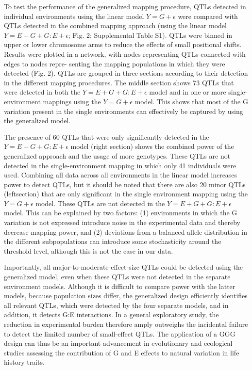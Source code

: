 To test the performance of the generalized mapping procedure, QTLs detected in individual environments
using the linear model $Y = G + \epsilon$ were compared with QTLs detected in the combined mapping 
approach (using the linear model $Y = E + G + G:E + \epsilon$; Fig. 2; Supplemental Table S1).
QTLs were binned in upper or lower chromosome arms to reduce the effects of small positional shifts.
Results were plotted in a network, with nodes representing QTLs connected with edges to nodes repre-
senting the mapping populations in which they were detected (Fig. 2). QTLs are grouped in three sections
according to their detection in the different mapping procedures. The middle section shows 73 QTLs that
were detected in both the $Y = E + G + G:E + \epsilon$ model and in one or more single-environment mappings 
using the $Y = G + \epsilon$ model. This shows that most of the G variation present in the single environments 
can effectively be captured by using the generalized model.

The presence of 60 QTLs that were only significantly detected in the $Y = E + G + G:E + \epsilon$ model 
(right section) shows the combined power of the generalized approach and the usage of more genotypes. 
These QTLs are not detected in the single-environment mapping in which only 41 individuals were used.
Combining all data across all environments in the linear model increases power to detect QTLs, but it
should be noted that there are also 20 minor QTLs (leftsection) that are only significant in the single
environment mapping using the $Y = G + \epsilon$ model. These QTLs are not detected in the $ Y = E + G + G:E + \epsilon$
model. This can be explained by two factors: (1) environments in which the G variation is not expressed
introduce noise in the experimental data and thereby decrease mapping power, and (2) deviations from a
balanced allele distribution in the different subpopulations can introduce some stochasticity around the
threshold level, although this is not the case in our data.

Importantly, all major-to-moderate-effect-size QTLs could be detected using the generalized model, even
when these QTLs were not detected in the separate environment models. Although it is difficult to 
compare power with the latter models, because population sizes differ, the generalized design 
efficiently identifies all relevant QTLs, which were detected by the four separate models, and in addition, 
it detects G:E interactions. In a general exploratory study, the reduction in experimental burden therefore 
amply outweighs the incidental failure to detect the limited number of small-effect QTLs. The application 
of a GGG design can thus be an important advancement in evolutionary and ecological studies assessing 
the contribution of G and E effects to natural variation in life history traits.


